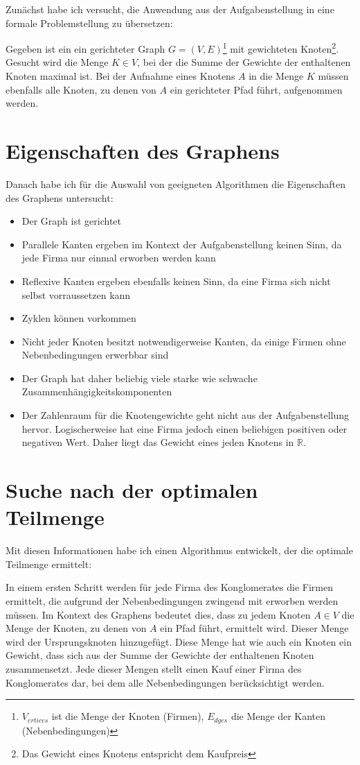 Zunächst habe ich versucht, die Anwendung aus der Aufgabenstellung in eine formale Problemstellung zu übersetzen:
\begin{displayquote}
	Gegeben ist ein ein gerichteter Graph \(G=(V,E)\)\footnote{\(V_{ertices}\) ist die Menge der Knoten (Firmen), \(E_{dges}\) die Menge der Kanten (Nebenbedingungen)} mit gewichteten Knoten\footnote{Das Gewicht eines Knotens entspricht dem Kaufpreis}. Gesucht wird die Menge \(K \in V\), bei der die Summe der Gewichte der enthaltenen Knoten maximal ist. Bei der Aufnahme eines Knotens  \(A\) in die Menge \(K\) müssen ebenfalls alle Knoten, zu denen von \(A\) ein gerichteter Pfad führt, aufgenommen werden.
\end{displayquote}

\section{Eigenschaften des Graphens}
Danach habe ich für die Auswahl von geeigneten Algorithmen die Eigenschaften des Graphens untersucht:
\begin{itemize}
	\item Der Graph ist gerichtet
	\item Parallele Kanten ergeben im Kontext der Aufgabenstellung keinen Sinn, da jede Firma nur einmal erworben werden kann
	\item Reflexive Kanten ergeben ebenfalls keinen Sinn, da eine Firma sich nicht selbst vorraussetzen kann
	\item Zyklen können vorkommen
	\item Nicht jeder Knoten besitzt notwendigerweise Kanten, da einige Firmen ohne Nebenbedingungen erwerbbar sind
	\item Der Graph hat daher beliebig viele starke wie schwache Zusammenhängigkeitskomponenten
	\item Der Zahlenraum für die Knotengewichte geht nicht aus der Aufgabenstellung hervor. Logischerweise hat eine Firma jedoch einen beliebigen positiven oder negativen Wert. Daher liegt das Gewicht eines jeden Knotens in \(\mathbb{R}\).
\end{itemize}

\section{Suche nach der optimalen Teilmenge}
Mit diesen Informationen habe ich einen Algorithmus entwickelt, der die optimale Teilmenge ermittelt:

In einem ersten Schritt werden für jede Firma des Konglomerates die Firmen ermittelt, die aufgrund der Nebenbedingungen zwingend mit erworben werden müssen. Im Kontext des Graphens bedeutet dies, dass zu jedem Knoten \(A \in V\) die Menge der Knoten, zu denen von \(A\) ein Pfad führt, ermittelt wird. Dieser Menge wird der Ursprungsknoten hinzugefügt. Diese Menge hat wie auch ein Knoten ein Gewicht, dass sich aus der Summe der Gewichte der enthaltenen Knoten zusammensetzt. Jede dieser Mengen stellt einen Kauf einer Firma des Konglomerates dar, bei dem alle Nebenbedingungen berücksichtigt werden.

